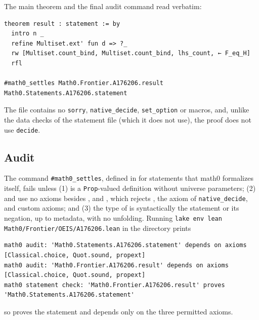 \documentclass[11pt]{amsart}
\theoremstyle{plain}
\theoremstyle{definition}
\begin{document}
The main theorem and the final audit command read verbatim:\par\nobreak\vspace{4pt}\nobreak\noindent
\begin{minipage}{\linewidth}
\begin{lstlisting}
theorem result : statement := by
  intro n _
  refine Multiset.ext' fun d => ?_
  rw [Multiset.count_bind, Multiset.count_bind, lhs_count, ← F_eq_H]
  rfl

#math0_settles Math0.Frontier.A176206.result Math0.Statements.A176206.statement
\end{lstlisting}
\end{minipage}
The file contains no \texttt{sorry}, \texttt{native\_decide}, \texttt{set\_option} or macros, and, unlike the data checks of the statement file (which it does not use), the proof does not use \texttt{decide}.

\subsection*{Audit}
The command \texttt{\#math0\_settles}, defined in  for statements that math0 formalizes itself, fails unless (1)  is a \texttt{Prop}-valued definition without universe parameters; (2)  and  use no axioms besides ,  and , which rejects , the axiom  of \texttt{native\_decide}, and custom axioms; and (3) the type of  is syntactically the statement or its negation, up to metadata, with no unfolding.
Running \texttt{lake env lean Math0/Frontier/OEIS/A176206.lean} in the directory  prints\par\nobreak\vspace{4pt}\nobreak\noindent
\begin{minipage}{\linewidth}
\begin{lstlisting}[basicstyle=\ttfamily\scriptsize]
math0 audit: 'Math0.Statements.A176206.statement' depends on axioms [Classical.choice, Quot.sound, propext]
math0 audit: 'Math0.Frontier.A176206.result' depends on axioms [Classical.choice, Quot.sound, propext]
math0 statement check: 'Math0.Frontier.A176206.result' proves 'Math0.Statements.A176206.statement'
\end{lstlisting}
\end{minipage}
so  proves the statement and depends only on the three permitted axioms.
\end{document}
